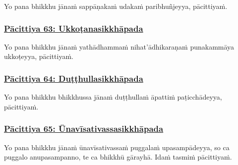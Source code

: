 Yo pana bhikkhu jānaṁ sappāṇakaṁ\makeatletter\hyperlink{endnote347-appendix}\makeatother{} udakaṁ paribhuñjeyya, pācittiyaṁ.



\subsubsection*{\hyperref[exp63]{Pācittiya 63: Ukkoṭanasikkhāpada}}
\label{pac63}

Yo pana bhikkhu jānaṁ yathādhammaṁ nihat'ādhikaraṇaṁ\makeatletter\hyperlink{endnote348-appendix}\makeatother{} punakammāya ukkoṭeyya, pācittiyaṁ.



\subsubsection*{\hyperref[exp64]{Pācittiya 64: Duṭṭhullasikkhāpada}}
\label{pac64}

Yo pana bhikkhu bhikkhussa jānaṁ duṭṭhullaṁ āpattiṁ paṭicchādeyya, pācittiyaṁ.



\subsubsection*{\hyperref[exp65]{Pācittiya 65: Ūnavīsativassasikkhāpada}}
\label{pac65}

Yo pana bhikkhu jānaṁ ūnavīsativassaṁ\makeatletter\hyperlink{endnote349-appendix}\makeatother{} puggalaṁ upasampādeyya, so ca puggalo anupasampanno,\makeatletter\hyperlink{endnote350-appendix}\makeatother{} te ca\makeatletter\hyperlink{endnote351-appendix}\makeatother{} bhikkhū gārayhā. Idaṁ tasmiṁ pācittiyaṁ.



